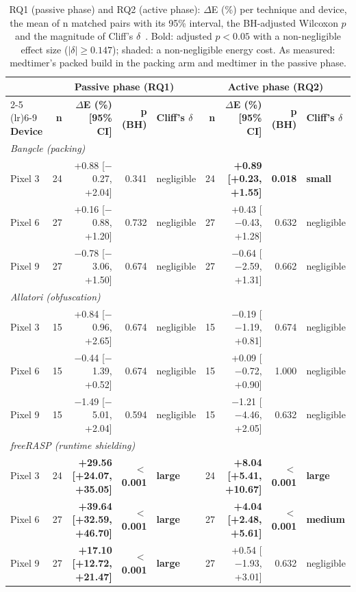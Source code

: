 \begin{table}[t]
\centering
\small
\caption{RQ1 (passive phase) and RQ2 (active phase): $\Delta$E (\%) per technique and device, the mean of n matched pairs with its 95\% interval, the BH-adjusted Wilcoxon $p$ and the magnitude of Cliff's $\delta$~\cite{romano2006cliff}. Bold: adjusted $p < 0.05$ with a non-negligible effect size ($|\delta| \geq 0.147$); shaded: a non-negligible energy cost. As measured: medtimer's packed build in the packing arm and medtimer in the passive phase.}
\label{tab:rq12-with-medtimer}
\begin{tabular}{lrrrlrrrl}
\toprule
 & \multicolumn{4}{c}{\textbf{Passive phase (RQ1)}} & \multicolumn{4}{c}{\textbf{Active phase (RQ2)}} \\
\cmidrule(lr){2-5} \cmidrule(lr){6-9}
\textbf{Device} & \textbf{n} & \textbf{$\Delta$E (\%) [95\% CI]} & \textbf{p (BH)} & \textbf{Cliff's $\delta$} & \textbf{n} & \textbf{$\Delta$E (\%) [95\% CI]} & \textbf{p (BH)} & \textbf{Cliff's $\delta$} \\
\midrule
\multicolumn{9}{l}{\textit{Bangcle (packing)}} \\
Pixel 3 & 24 & +0.88 [$-$0.27, +2.04] & 0.341 & negligible & 24 & \cellcolor{red!12}\textbf{+0.89 [+0.23, +1.55]} & \textbf{0.018} & \textbf{small} \\
Pixel 6 & 27 & +0.16 [$-$0.88, +1.20] & 0.732 & negligible & 27 & +0.43 [$-$0.43, +1.28] & 0.632 & negligible \\
Pixel 9 & 27 & $-$0.78 [$-$3.06, +1.50] & 0.674 & negligible & 27 & $-$0.64 [$-$2.59, +1.31] & 0.662 & negligible \\
\midrule
\multicolumn{9}{l}{\textit{Allatori (obfuscation)}} \\
Pixel 3 & 15 & +0.84 [$-$0.96, +2.65] & 0.674 & negligible & 15 & $-$0.19 [$-$1.19, +0.81] & 0.674 & negligible \\
Pixel 6 & 15 & $-$0.44 [$-$1.39, +0.52] & 0.674 & negligible & 15 & +0.09 [$-$0.72, +0.90] & 1.000 & negligible \\
Pixel 9 & 15 & $-$1.49 [$-$5.01, +2.04] & 0.594 & negligible & 15 & $-$1.21 [$-$4.46, +2.05] & 0.632 & negligible \\
\midrule
\multicolumn{9}{l}{\textit{freeRASP (runtime shielding)}} \\
Pixel 3 & 24 & \cellcolor{red!12}\textbf{+29.56 [+24.07, +35.05]} & \textbf{$<$ 0.001} & \textbf{large} & 24 & \cellcolor{red!12}\textbf{+8.04 [+5.41, +10.67]} & \textbf{$<$ 0.001} & \textbf{large} \\
Pixel 6 & 27 & \cellcolor{red!12}\textbf{+39.64 [+32.59, +46.70]} & \textbf{$<$ 0.001} & \textbf{large} & 27 & \cellcolor{red!12}\textbf{+4.04 [+2.48, +5.61]} & \textbf{$<$ 0.001} & \textbf{medium} \\
Pixel 9 & 27 & \cellcolor{red!12}\textbf{+17.10 [+12.72, +21.47]} & \textbf{$<$ 0.001} & \textbf{large} & 27 & +0.54 [$-$1.93, +3.01] & 0.632 & negligible \\
\bottomrule
\end{tabular}
\end{table}
